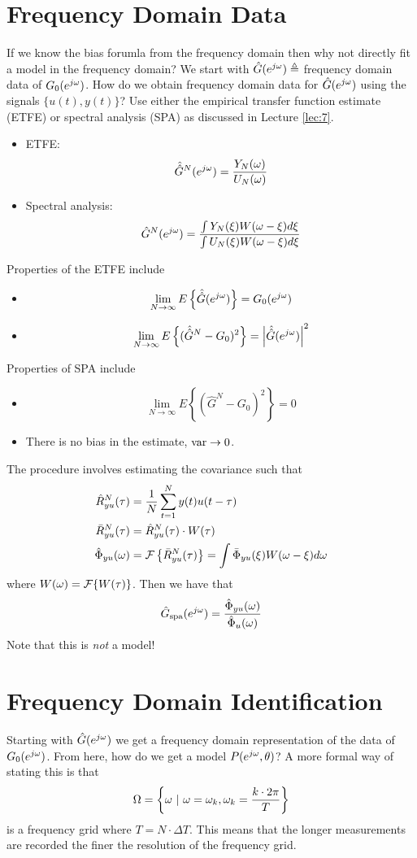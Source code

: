\section{Frequency Domain Data}
If we know the bias forumla from the frequency domain then why not directly fit a model in the frequency domain? We start with $\hat{G}(e^{j\omega}) \triangleq$ frequency domain data of $G_0(e^{j\omega})$. How do we obtain frequency domain data for $\hat{G}(e^{j\omega})$ using the signals $\{u(t),y(t)\}$? Use either the empirical transfer function estimate (ETFE) or spectral analysis (SPA) as discussed in Lecture \ref{lec:7}.
\begin{itemize}
\item ETFE:
$$\hat{\hat{G}}^N(e^{j\omega}) = \frac{Y_N(\omega)}{U_N(\omega)}$$
\item Spectral analysis:
$$\hat{G}^N(e^{j\omega}) = \frac{\int Y_N(\xi)W(\omega-\xi)d\xi}{\int U_N(\xi)W(\omega-\xi)d\xi}$$
\end{itemize}
Properties of the ETFE include
\begin{itemize}
\item $$\lim_{N\to\infty}E\left\lbrace \hat{\hat{G}}(e^{j\omega})\right\rbrace = G_0(e^{j\omega})$$
\item $$\lim_{N\to\infty}E\left\lbrace (\hat{\hat{G}}^N-G_0)^2\right\rbrace = \left|\hat{\hat{G}}(e^{j\omega})\right|^2$$
\end{itemize}
Properties of SPA include
\begin{itemize}
\item $$\lim_{N\to\infty}E\left\lbrace (\hat{G}^N-G_0)^2\right\rbrace = 0$$
\item There is no bias in the estimate, $\text{var}\to0$.
\end{itemize}
The procedure involves estimating the covariance such that
\begin{align*}
\hat{R}_{yu}^N(\tau) &= \frac{1}{N}\sum_{t=1}^N y(t)u(t-\tau) \\
\bar{R}_{yu}^N(\tau) &= \hat{R}_{yu}^N(\tau)\cdot W(\tau) \\
\hat{\Phi}_{yu}(\omega) &= \mathcal{F}\left\lbrace \bar{R}_{yu}^N(\tau)\right\rbrace = \int\bar{\Phi}_{yu}(\xi) W(\omega-\xi)d\omega
\end{align*}
where $W(\omega) = \mathcal{F}\{W(\tau)\}$. Then we have that
$$\hat{G}_{\text{spa}}(e^{j\omega}) = \frac{\hat{\Phi}_{yu}(\omega)}{\hat{\Phi}_u(\omega)}$$
Note that this is \textit{not} a model!

\section{Frequency Domain Identification}
Starting with $\hat{G}(e^{j\omega})$ we get a frequency domain representation of the data of $G_0(e^{j\omega})$. From here, how do we get a model $P(e^{j\omega},\theta)$? A more formal way of stating this is that
$$\Omega = \left\lbrace \omega ~|~ \omega=\omega_k, \omega_k=\frac{k\cdot 2\pi}{T} \right\rbrace$$
is a frequency grid where $T=N\cdot\Delta T$. This means that the longer measurements are recorded the finer the resolution of the frequency grid.

